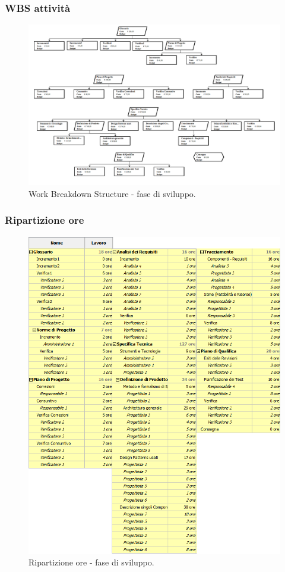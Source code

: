 \documentclass[a4paper]{article}
\begin{document}
			\subsubsection{WBS attività}
				\begin{figure}[H]
					\centering
					\includegraphics[scale=0.3]{wbs_sviluppo}
					\caption{Work Breakdown Structure - fase di sviluppo.}
				\end{figure}
			\subsubsection{Ripartizione ore}
				\begin{figure}[H]
					\centering
					\includegraphics[scale=0.6]{ro_sviluppo}
					\caption{Ripartizione ore - fase di sviluppo.}
				\end{figure}
				
\end{document}
